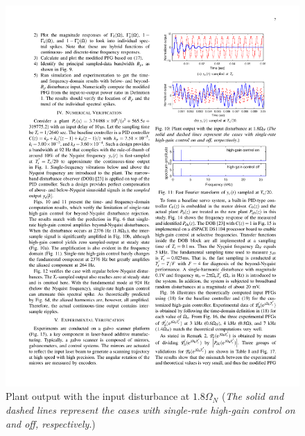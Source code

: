 \documentclass [11pt, proquest] {uwthesis}[2020/02/24]
\begin{document}
\begin{figure}[!ht]
\begin{centering}
{\begin{centering}
\includegraphics[width=13cm]{Spectral-analysis/FIG10b.pdf}
\par\end{centering}
}
\par\end{centering}
\caption{\label{fig:Plant-output-for}Plant output with the input disturbance
at $1.8\Omega_{N}$ (\emph{The solid and dashed lines represent the
cases with single-rate high-gain control on and off, respectively}.)}
\end{figure}
\end{document}
